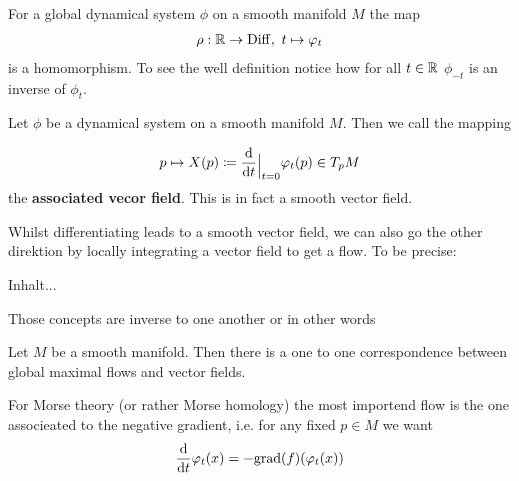 \begin{corollary}
	For a global dynamical system $\phi$ on a smooth manifold $M$ the map
	\begin{align*}
		\rho: \mathbb{R} \to \operatorname{\mathrm{Diff}},~t\mapsto \varphi_t
	\end{align*}is a homomorphism. To see the well definition notice how for all $t\in \mathbb{R}$ $\phi_{-t}$ is an inverse of $\phi_t$.
\end{corollary}
\begin{definition}
Let $\phi$ be a dynamical system on a smooth manifold $M$. Then we call the mapping

\begin{align*}
	p\mapsto X(p)\coloneq \frac{\diff }{\diff t}\einsch{t=0}\phi_t(p)\in T_pM
\end{align*} the \textbf{associated vecor field}. This is in fact a smooth vector field. 
\end{definition}
Whilst differentiating leads to a smooth vector field, we can also go the other direktion by locally integrating a vector field to get a flow. To be precise:
\begin{definition}
	Inhalt...
\end{definition}
Those concepts are inverse to one another or in other words
\begin{theorem}
	Let $M$ be a smooth manifold. Then there is a one to one correspondence between global maximal flows and vector fields.
\end{theorem}
\begin{definition}
For Morse theory (or rather Morse homology) the most importend flow is the one associeated to the negative gradient, i.e. for any fixed $p\in M$ we want
\begin{align*}
	\frac{\mathop{}\!\mathrm{d} }{\mathop{}\!\mathrm{d} t}\varphi_t(x)=-\mathrm{grad}(f)(\varphi_t(x))
\end{align*}
\end{definition}

